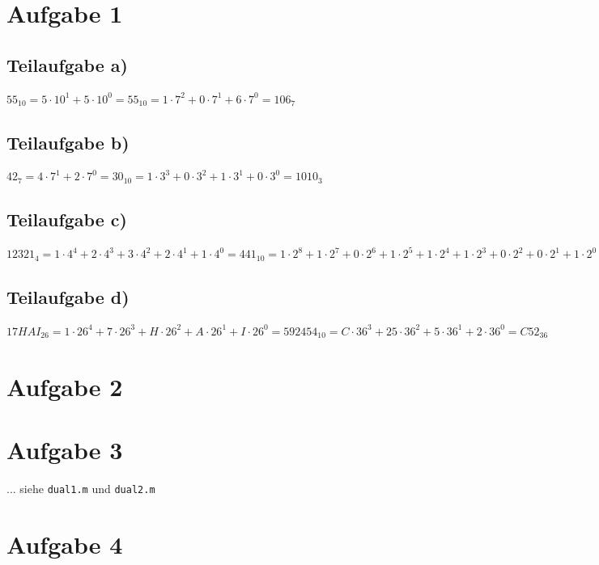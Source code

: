 \documentclass{llncs}
\begin{document}
\section*{Aufgabe 1}

\subsection*{Teilaufgabe a)}

$55_{10} = 5 \cdot 10^1 + 5 \cdot 10^0 = 55_{10} = 1 \cdot 7^2 + 0 \cdot 7^1 + 6 \cdot 7^0 = 106_{7}$

\subsection*{Teilaufgabe b)}

$42_{7} = 4 \cdot 7^1 + 2 \cdot 7^0 = 30_{10} = 1 \cdot 3^3 + 0 \cdot 3^2 + 1 \cdot 3^1 + 0 \cdot 3^0 = 1010_{3}$

\subsection*{Teilaufgabe c)}

$12321_{4} = 1 \cdot 4^4 + 2 \cdot 4^3 + 3 \cdot 4^2 + 2 \cdot 4^1 +1 \cdot 4^0 = 441_{10} = 1 \cdot 2^8 + 1 \cdot 2^7 + 0 \cdot 2^6 + 1 \cdot 2^5 + 1 \cdot 2^4 + 1 \cdot 2^3 + 0 \cdot 2^2 + 0 \cdot 2^1 + 1 \cdot 2^0 = 110111001_{2}$

\subsection*{Teilaufgabe d)}

$17HAI_{26} = 1 \cdot 26^4 + 7 \cdot 26^3 + H \cdot 26^2 + A \cdot 26^1 + I \cdot 26^0 = 592454_{10} = C \cdot 36^3 + 25 \cdot 36^2 + 5 \cdot 36^1 + 2 \cdot 36^0 = C52_{36}$

\section*{Aufgabe 2}

\section*{Aufgabe 3}

... siehe \texttt{dual1.m} und \texttt{dual2.m}

\section*{Aufgabe 4}
\end{document}
